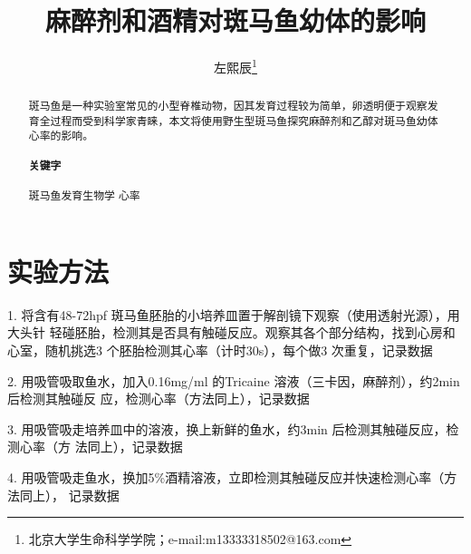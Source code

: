 \documentclass[UTF-8,10.5pt]{ctexart}
\author{左熙辰\thanks{北京大学生命科学学院；e-mail:m13333318502@163.com}}
\date{}
\title{麻醉剂和酒精对斑马鱼幼体的影响}
\begin{document}
    \maketitle
    \begin{abstract}
        \normalsize
        斑马鱼是一种实验室常见的小型脊椎动物，因其发育过程较为简单，卵透明便于观察发育全过程而受到科学家青睐，本文将使用野生型斑马鱼探究麻醉剂和乙醇对斑马鱼幼体心率的影响。
        \paragraph*{关键字}斑马鱼\text{ }发育生物学\text{ } 心率 
    \end{abstract}
    \section{实验方法}
    1. 将含有48-72hpf 斑马鱼胚胎的小培养皿置于解剖镜下观察（使用透射光源），用大头针
轻碰胚胎，检测其是否具有触碰反应。观察其各个部分结构，找到心房和心室，随机挑选3
个胚胎检测其心率（计时30s），每个做3 次重复，记录数据

2. 用吸管吸取鱼水，加入0.16mg/ml 的Tricaine 溶液（三卡因，麻醉剂），约2min 后检测其触碰反
应，检测心率（方法同上），记录数据

3. 用吸管吸走培养皿中的溶液，换上新鲜的鱼水，约3min 后检测其触碰反应，检测心率（方
法同上），记录数据

4. 用吸管吸走鱼水，换加5\%酒精溶液，立即检测其触碰反应并快速检测心率（方法同上），
记录数据
\end{document}

